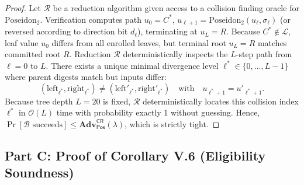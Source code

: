 \documentclass[10pt,letterpaper,journal]{IEEEtran}
\begin{document}
\begin{proof}
Let $\mathcal{R}$ be a reduction algorithm given access to a collision finding oracle for $\mathrm{Poseidon}_2$. Verification computes path $u_0 = C^\ast$, $u_{\ell+1} = \mathrm{Poseidon}_2(u_\ell, \sigma_\ell)$ (or reversed according to direction bit $d_\ell$), terminating at $u_L = R$.
Because $C^\ast \notin \mathcal{L}$, leaf value $u_0$ differs from all enrolled leaves, but terminal root $u_L = R$ matches committed root $R$.
Reduction $\mathcal{R}$ deterministically inspects the $L$-step path from $\ell = 0$ to $L$. There exists a unique minimal divergence level $\ell^\ast \in \{0, \dots, L-1\}$ where parent digests match but inputs differ:
\begin{equation}
  (\mathrm{left}_{\ell^\ast}, \mathrm{right}_{\ell^\ast}) \neq (\mathrm{left}'_{\ell^\ast}, \mathrm{right}'_{\ell^\ast}) \quad\text{with}\quad u_{\ell^\ast+1} = u'_{\ell^\ast+1}.
\end{equation}
Because tree depth $L=20$ is fixed, $\mathcal{R}$ deterministically locates this collision index $\ell^\ast$ in $\mathcal{O}(L)$ time with probability exactly 1 without guessing. Hence, $\Pr[\mathcal{B}\text{ succeeds}] \leq \mathbf{Adv}^{\mathsf{CR}}_{\mathsf{Pos}}(\lambda)$, which is strictly tight.
\end{proof}

\subsection{Part C: Proof of Corollary V.6 (Eligibility Soundness)}
\label{sec:supp-proof-eligibility}
\end{document}
